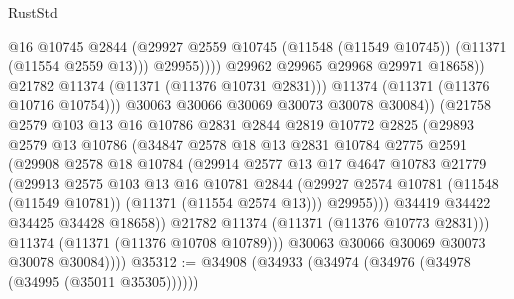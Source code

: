 \begin{lexlean}{RustStd}
\begin{coremodule}
                                  @16
                                  @10745
                                  @2844
                                  (@29927
                                    @2559
                                    @10745
                                    (@11548 (@11549 @10745))
                                    (@11371 (@11554 @2559 @13)))
                                  @29955))))
                          @29962
                          @29965
                          @29968
                          @29971
                          @18658))
                      @21782
                      @11374
                      (@11371 (@11376 @10731 @2831)))
                    @11374
                    (@11371 (@11376 @10716 @10754)))
                  @30063
                  @30066
                  @30069
                  @30073
                  @30078
                  @30084))
              (@21758
                @2579
                @103
                @13
                @16
                @10786
                @2831
                @2844
                @2819
                @10772
                @2825
                (@29893
                  @2579
                  @13
                  @10786
                  (@34847
                    @2578
                    @18
                    @13
                    @2831
                    @10784
                    @2775
                    @2591
                    (@29908
                      @2578
                      @18
                      @10784
                      (@29914
                        @2577
                        @13
                        @17
                        @4647
                        @10783
                        @21779
                        (@29913
                          @2575
                          @103
                          @13
                          @16
                          @10781
                          @2844
                          (@29927 @2574 @10781 (@11548 (@11549 @10781)) (@11371 (@11554 @2574 @13)))
                          @29955)))
                    @34419
                    @34422
                    @34425
                    @34428
                    @18658))
                @21782
                @11374
                (@11371 (@11376 @10773 @2831)))
              @11374
              (@11371 (@11376 @10708 @10789)))
            @30063
            @30066
            @30069
            @30073
            @30078
            @30084))))
@35312 := @34908 (@34933 (@34974 (@34976 (@34978 (@34995 (@35011 @35305))))))

\end{coremodule}
\end{lexlean}
